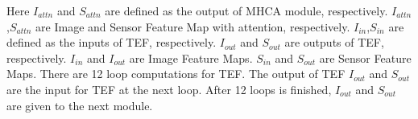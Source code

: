 \documentclass[acmsmall, screen]{acmart}
\begin{document}
Here \begin{math}
  I_{attn}
\end{math} and \begin{math}
  S_{attn}
\end{math} are defined as the output of MHCA module, respectively. \begin{math}
  I_{attn}
\end{math},\begin{math}
  S_{attn}
\end{math} are Image and Sensor Feature Map with attention, respectively. \begin{math}
  I_{in}
\end{math},\begin{math}
  S_{in}
\end{math} are defined as the inputs of TEF, respectively. \begin{math}
  I_{out}
\end{math} and \begin{math}
  S_{out}
\end{math} are outputs of TEF, respectively. \begin{math}
  I_{in}
\end{math} and \begin{math}
  I_{out}
\end{math} are Image Feature Maps. \begin{math}
  S_{in}
\end{math} and \begin{math}
  S_{out}
\end{math} are Sensor Feature Maps. There are 12 loop computations for TEF. The output of TEF \begin{math}
  I_{out}
\end{math} and \begin{math}
  S_{out}
\end{math} are the input for TEF at the next loop. After 12 loops is finished, \begin{math}
  I_{out}
\end{math} and \begin{math}
  S_{out}
\end{math} are given to the next module.
\end{document}
